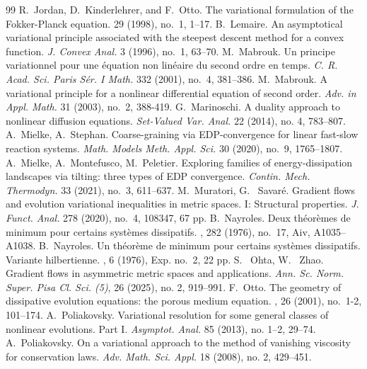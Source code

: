 \documentclass[10pt,a4paper]{amsart}
\begin{document}
\begin{thebibliography}{99}
 R.~Jordan, D.~Kinderlehrer, and F.~Otto. \newblock The variational formulation of the Fokker-Planck equation.  29 (1998), no.~1, 1--17.
 {B.~Lemaire}. An asymptotical variational principle associated with the steepest descent method for a convex function. {\it J. Convex Anal.} 3 (1996), no.~1, 63--70.
 M.~Mabrouk. Un principe variationnel pour une \'equation non lin\'eaire du second ordre en temps. {\it C. R. Acad. Sci. Paris S\'er. I Math.} 332 (2001), no.~4, 381--386.
 M.~Mabrouk. A variational principle for a nonlinear differential equation of second order. {\it Adv. in Appl. Math.} 31 (2003), no.~2, 388-419.
 G.~Marinoschi. A duality approach to nonlinear diffusion equations. {\it Set-Valued Var. Anal.} 22 (2014), no. 4, 783--807.
 A.~Mielke, A.~Stephan. Coarse-graining via EDP-convergence for linear fast-slow reaction systems. {\it Math. Models Meth. Appl. Sci.} 30 (2020), no.~9, 1765--1807.
 A.~Mielke, A.~Montefusco, M.~Peletier. Exploring families of energy-dissipation landscapes via tilting: three types of EDP convergence. {\it Contin. Mech. Thermodyn.} 33 (2021), no.~3, 611--637.
 M.~Muratori, G.~ Savar\'e. Gradient flows and evolution variational inequalities in metric spaces. I: Structural properties. {\it J. Funct. Anal.} 278 (2020), no.~4, 108347, 67 pp.
 B.~Nayroles. \newblock Deux th\'eor\`emes de minimum pour certains syst\`emes dissipatifs. , 282 (1976), no.~17, Aiv, A1035--A1038.
 B.~Nayroles. \newblock Un th\'eor\`eme de minimum pour certains syst\`emes dissipatifs. {V}ariante hilbertienne. , 6 (1976), Exp. no.~2, 22 pp.
 S.~ Ohta, W.~ Zhao. Gradient flows in asymmetric metric spaces and applications. {\it Ann. Sc. Norm. Super. Pisa Cl. Sci. (5)}, 26 (2025), no. 2, 919--991.
 F.~Otto. \newblock The geometry of dissipative evolution equations: the porous medium equation. , 26 (2001), no.~1-2, 101--174.
 A.~Poliakovsky. Variational resolution for some general classes of nonlinear evolutions. Part I. {\it Asymptot. Anal.} 85 (2013), no. 1--2, 29--74.
 A.~Poliakovsky. On a variational approach to the method of vanishing viscosity for conservation laws. {\it Adv. Math. Sci. Appl.} 18 (2008), no. 2, 429--451.

\end{thebibliography}
\end{document}
